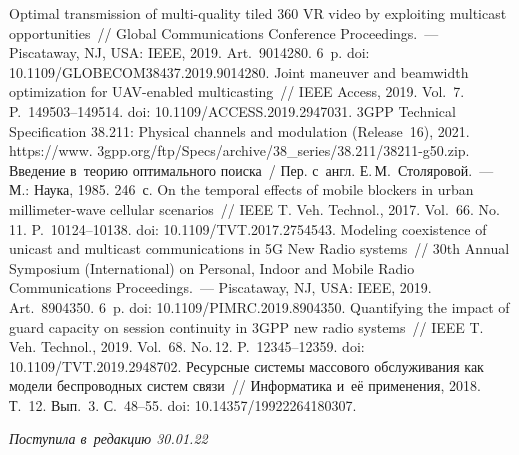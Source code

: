 \begin{multicols}{2}
{{\begin{thebibliography}{99}
 Optimal transmission of multi-quality tiled 360 VR video by 
exploiting multicast opportunities~// Global Communications Conference 
 Proceedings.~--- Piscataway, NJ, USA: IEEE, 2019. Art.~9014280. 6~p. doi: 
10.1109/\linebreak GLOBECOM38437.2019.9014280.
 Joint maneuver and beamwidth optimization for  
UAV-enabled multicasting~// IEEE Access, 2019. Vol.~7. P.~149503--149514. doi: 
10.1109/ACCESS.2019.2947031.
3GPP Technical Specification 38.211: Physical channels and modulation (Release~16), 2021. 
{\sf https://www. 3gpp.org/ftp/Specs/archive/38\_series/38.211/38211-g50.zip}.
 Введение в~теорию оптимального поиска~/ Пер. с~англ. 
Е.\,М.~Столяровой.~--- М.: Наука, 1985. 246~с.
 On the temporal effects of mobile blockers 
in urban millimeter-wave cellular scenarios~// IEEE T. Veh. Technol., 2017. 
Vol.~66. No.\,11. P.~10124--10138. doi: 10.1109/TVT.2017.2754543.
Modeling coexistence of unicast and multicast communications in 5G New Radio systems~// 
30th Annual  Symposium (International) on Personal, Indoor and Mobile Radio 
Communications  Proceedings.~--- Piscataway, NJ, USA: IEEE, 2019. Art.~8904350. 
6~p. doi: 10.1109/PIMRC.2019.8904350.
 Quantifying the impact of guard capacity on session continuity in 3GPP new radio 
systems~// IEEE T. Veh. Technol., 2019. Vol.~68. No.\,12. P.~12345--12359. 
doi: 10.1109/TVT.2019.2948702.
 Ресурсные системы массового обслуживания как модели беспроводных систем 
связи~// Информатика и~её применения, 2018. 
Т.~12. Вып.~3. С.~48--55. doi: 10.14357/19922264180307.
 \end{thebibliography}

 }
 }

\end{multicols}

\vspace*{-6pt}

\hfill{\small\textit{Поступила в~редакцию 30.01.22}}

